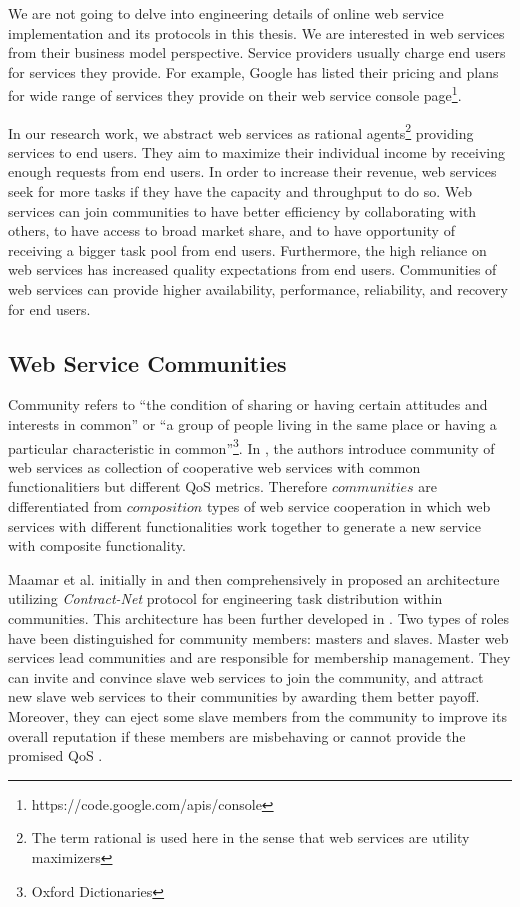 We are not going to delve into engineering details of online web
service implementation and its protocols in this thesis. We are
interested in web services from their business model perspective.
Service providers usually charge end users for services they
provide. For example, Google has listed their pricing and plans
for wide range of services they provide on their web service
console page\footnote{https://code.google.com/apis/console}.

In our research work, we abstract web services as rational
agents\footnote{The term
        rational is used here in the sense that web services are utility
        maximizers} providing services to end users. They aim to maximize
        their individual income by receiving enough requests from end
        users. In order to increase their revenue, web services seek for
        more tasks if they have the capacity and throughput to do so. Web
        services can join communities to have better efficiency by
        collaborating with others, to have access to broad market share,
        and to have opportunity of receiving a bigger task pool from end
        users. Furthermore, the high reliance on web services has increased quality expectations from end users.
        Communities of web services can provide higher availability, performance, reliability, and recovery for end users.

\subsection{Web Service Communities}\label{sec:CWSDefinition}
Community refers to ``the condition of sharing or having certain
attitudes and interests in common'' or ``a group of people living
in the same place or having a particular characteristic in
common''\footnote{Oxford Dictionaries}. In
\cite{DBLP:journals/internet/BenatallahSD03,
Zeng:2003:QDW:775152.775211}, the authors introduce community of
web services as collection of cooperative web services with common
functionalitiers but different QoS metrics. Therefore
$communities$ are differentiated from $composition$ types of web
service cooperation in which web services with different
functionalities work together to generate a new service with
composite functionality.


Maamar et al. initially in \cite{conf/webist/MaamarLBTS07} and
then comprehensively in \cite{DBLP:journals/ijebr/MaamarSTBB09}
proposed an architecture utilizing \emph{Contract-Net} protocol
for engineering task distribution within communities. This
architecture has been further developed in
\cite{conf/IEEEscc/BenharrefSBB11, conf/IEEEscc/KhosravifarBMMT10,
conf/aina/LimTM11, CSTintercommunity}. Two types of roles have
been distinguished for community members: masters and slaves.
Master web services lead communities and are responsible for
membership management. They can invite and convince slave web
services to join the community, and attract new slave web services
to their communities by awarding them better payoff. Moreover,
they can eject some slave members from the community to improve
its overall reputation if these members are misbehaving or cannot
provide the promised QoS \cite{DBLP:journals/ijebr/MaamarSTBB09}.

